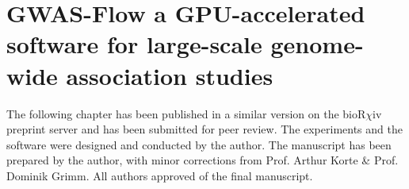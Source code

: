 
\chapter{GWAS-Flow a GPU-accelerated software for large-scale genome-wide association studies}

\label{Chapter2} %


The following chapter has been published in a similar version on the bioR$\chi$iv preprint
server \cite{Freudenthal_2019} and has been submitted for peer review. The experiments and
the software were designed and conducted by the author. The manuscript has been prepared
by the author, with minor corrections from Prof. Arthur Korte \& Prof. Dominik Grimm. All
authors approved of the final manuscript.


